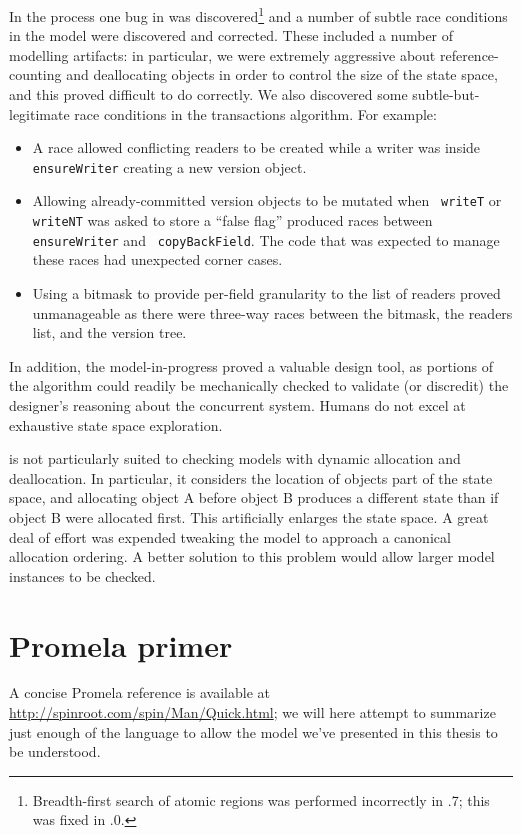 In the process one bug in \Spin was discovered\footnote{Breadth-first
search of atomic regions was performed incorrectly in .7;
this was fixed in .0.}
and a number of subtle race conditions in the model were discovered and
corrected.  These included a number of modelling artifacts: in
particular, we were extremely aggressive about reference-counting and
deallocating objects in order to control the size of the state space,
and this proved difficult to do correctly.  We also discovered some
subtle-but-legitimate race conditions in the transactions algorithm.
For example:
\begin{itemize}
\item A race allowed conflicting readers to be created while a writer
  was inside {\tt ensureWriter} creating a new version object.
\item Allowing already-committed version objects to be mutated when {\tt
    writeT} or {\tt writeNT} was asked to store a ``false flag'' produced
  races between {\tt ensureWriter} and {\tt
    copyBackField}.  The code that was expected to manage these races
  had unexpected corner cases.
\item Using a bitmask to provide per-field granularity
  to the list of readers proved unmanageable as there were three-way
  races between the bitmask, the readers list, and the version tree.
\end{itemize}
In addition, the model-in-progress proved a valuable design tool, as
portions of the algorithm could readily be mechanically checked to
validate (or discredit) the designer's reasoning about the concurrent
system.  Humans do not excel at exhaustive state space exploration.

\Spin is not particularly suited to checking models with dynamic
allocation and deallocation.  In particular, it considers the
location of objects part of the state space, and allocating object
A before object B produces a different state than if object B
were allocated first.  This artificially enlarges the
state space.  A great deal of effort was expended tweaking the
model to approach a canonical allocation ordering.  A better solution
to this problem would allow larger model instances to be checked.


\section{Promela primer}\label{sec:promela}
A concise Promela reference is available at
\url{http://spinroot.com/spin/Man/Quick.html}; we will here attempt to
summarize just enough of the language to allow the model we've
presented in this thesis to be understood.

